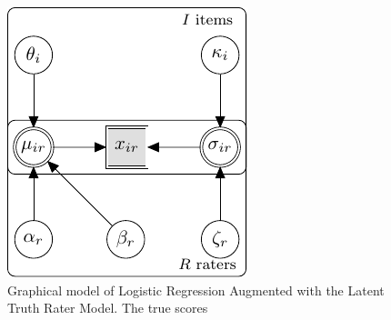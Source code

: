 \documentclass[a4paper,11pt]{article}
\begin{document}
\begin{figure}[!ht]
		\centering
		\includegraphics[width=\textwidth, page=9]{graphicalmodels.pdf}
	\caption{Graphical model of Logistic Regression Augmented with the Latent Truth Rater Model. The true scores }
	\label{model:Logistic_LTM}
\end{figure}
\end{document}
